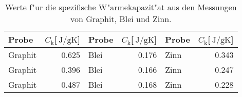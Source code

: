 
\begin{table}[!h]
\begin{center}
\begin{tabular}{|l|r|l|r|l|r|}
\hline
Probe & $C_\mathrm{k}$[$\SI{}{\joule\per\gram\kelvin}$] & Probe & $C_\mathrm{k}$[$\SI{}{\joule\per\gram\kelvin}$] & Probe & $C_\mathrm{k}$[$\SI{}{\joule\per\gram\kelvin}$]\\
\hline
\hline
Graphit & 0.625 & Blei & 0.176 & Zinn & 0.343 \\
Graphit & 0.396 & Blei & 0.166 & Zinn & 0.247 \\
Graphit & 0.487 & Blei & 0.168 & Zinn & 0.228 \\
\hline
\end{tabular}
\caption[]{Werte f"ur die spezifische W"armekapazit"at aus den Messungen von Graphit, Blei und Zinn.}
\label{kapa}
\end{center}
\end{table}
